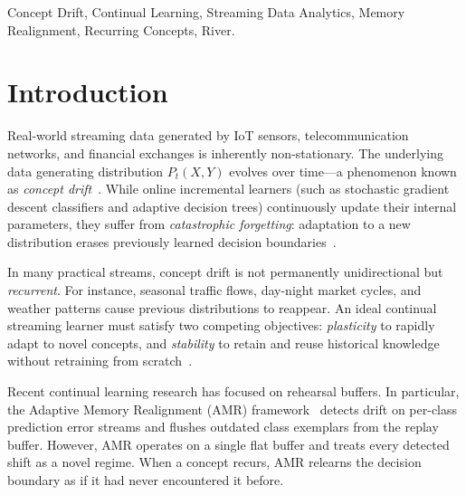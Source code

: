 \documentclass[conference]{IEEEtran}
\begin{document}
\begin{IEEEkeywords}
Concept Drift, Continual Learning, Streaming Data Analytics, Memory Realignment, Recurring Concepts, River.
\end{IEEEkeywords}

\section{Introduction}
Real-world streaming data generated by IoT sensors, telecommunication networks, and financial exchanges is inherently non-stationary. The underlying data generating distribution $P_t(X, Y)$ evolves over time—a phenomenon known as \textit{concept drift}~\cite{gama2014survey}. While online incremental learners (such as stochastic gradient descent classifiers and adaptive decision trees) continuously update their internal parameters, they suffer from \textit{catastrophic forgetting}: adaptation to a new distribution erases previously learned decision boundaries~\cite{parisi2019continual}.

In many practical streams, concept drift is not permanently unidirectional but \textit{recurrent}. For instance, seasonal traffic flows, day-night market cycles, and weather patterns cause previous distributions to reappear. An ideal continual streaming learner must satisfy two competing objectives: \textit{plasticity} to rapidly adapt to novel concepts, and \textit{stability} to retain and reuse historical knowledge without retraining from scratch~\cite{mermillod2013stability}.

Recent continual learning research has focused on rehearsal buffers. In particular, the Adaptive Memory Realignment (AMR) framework~\cite{ashrafee2025amr} detects drift on per-class prediction error streams and flushes outdated class exemplars from the replay buffer. However, AMR operates on a single flat buffer and treats every detected shift as a novel regime. When a concept recurs, AMR relearns the decision boundary as if it had never encountered it before.
\end{document}
